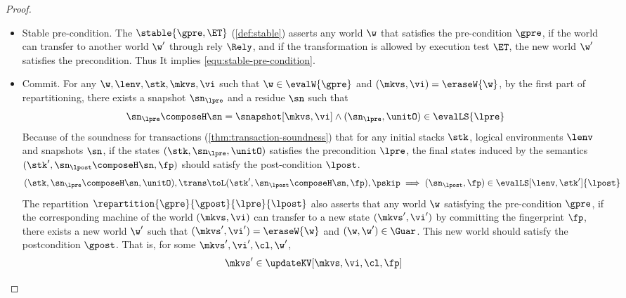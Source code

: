 \begin{proof}
\begin{itemize}
\begin{itemize}
\item Stable pre-condition.
The \( \stable{\gpre, \ET} \) (\cref{def:stable}) asserts any world \( \w \) that satisfies the pre-condition \( \gpre \), 
if the world can transfer to another world \( \w' \) through rely \( \Rely \), and if the transformation is allowed  by execution test \( \ET \), 
the new world \( \w' \) satisfies the precondition.
Thus It implies \cref{equ:stable-pre-condition}. 

\item Commit.
For any \( \w, \lenv, \stk, \mkvs, \vi \) such that \( \w \in \evalW{\gpre} \) and \( (\mkvs, \vi) = \eraseW{\w} \), by the first part of repartitioning,
there exists a snapshot \( \sn_\lpre\) and a residue \( \sn \) such that
\begin{equation}
\label{equ:local-pre-condition}
\sn_\lpre \composeH \sn = \snapshot[\mkvs, \vi] \land (\sn_\lpre, \unitO) \in \evalLS{\lpre}
\end{equation}
Because of the soundness for transactions (\cref{thm:transaction-soundness}) that for any initial stacks \( \stk \), logical environments \( \lenv \) and snapshots \( \sn \), 
if the states \( (\stk, \sn_\lpre, \unitO) \) satisfies the precondition \( \lpre \), the final states induced by the semantics \( (\stk', \sn_\lpost \composeH \sn, \fp) \) should satisfy the post-condition \( \lpost \).
\begin{equation}
\label{equ:local-transaction-sound}
\begin{array}{@{}l}
    (\stk, \sn_\lpre \composeH \sn, \unitO), \trans \toL (\stk', \sn_\lpost \composeH \sn, \fp), \pskip
    \implies (\sn_\lpost, \fp) \in \evalLS[\lenv,\stk']{\lpost}
\end{array}
\end{equation}
The repartition \( \repartition{\gpre}{\gpost}{\lpre}{\lpost} \) also asserts that any world \( \w \) satisfying the pre-condition \( \gpre \), 
if the corresponding machine of the world \( (\mkvs, \vi) \) can transfer to a new state \(  (\mkvs', \vi') \) by committing the fingerprint \( \fp \),
there exists a new world \( \w' \) such that \( (\mkvs', \vi') = \eraseW{\w} \) and \( (\w, \w') \in \Guar \).
This new world should satisfy the postcondition \( \gpost \).
That is, for some \( \mkvs', \vi', \cl, \w' \),
\begin{equation}                                    
\label{equ:repartition}
\begin{array}{@{}l}
    \mkvs' \in \updateKV[\mkvs, \vi, \cl, \fp]

\end{array}
\end{equation}
\end{itemize}
\end{itemize}
\end{proof}
